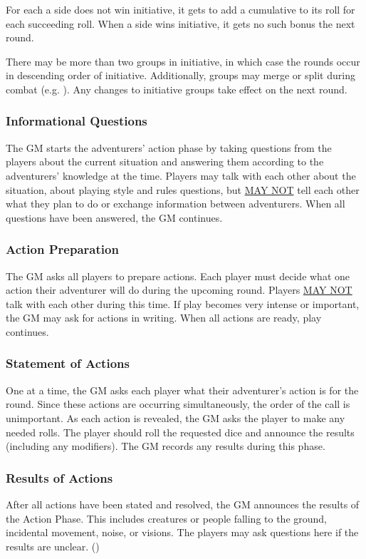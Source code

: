 \begin{multicols*}{2}
For each  a side does not win initiative, it gets to add a cumulative  to its roll for each succeeding roll. When a side wins initiative, it gets no such bonus the next round.

There may be more than two groups in initiative, in which case the rounds occur in descending order of initiative. Additionally, groups may merge or split during combat (e.g. ). Any changes to initiative groups take effect on the next round. 
\subsubsection{Informational Questions}
The GM starts the adventurers' action phase by taking questions from the players about the current situation and answering them according to the adventurers' knowledge at the time. Players may talk with each other about the situation, about playing style and rules questions, but \uline{MAY NOT} tell each other what they plan to do or exchange information between adventurers. When all questions have been answered, the GM continues.
\subsubsection{Action Preparation}
The GM asks all players to prepare actions. Each player must decide what one action their adventurer will do during the upcoming round. Players \uline{MAY NOT} talk with each other during this time. If play becomes very intense or important, the GM may ask for actions in writing. When all actions are ready, play continues.
\subsubsection{Statement of Actions}
One at a time, the GM asks each player what their adventurer's action is for the round. Since these actions are occurring simultaneously, the order of the call is unimportant. As each action is revealed, the GM asks the player to make any needed rolls. The player should roll the requested dice and announce the results (including any modifiers). The GM records any results during this phase.
\subsubsection{Results of Actions}
After all actions have been stated and resolved, the GM announces the results of the Action Phase. This includes creatures or people falling to the ground, incidental movement, noise, or visions. The players may ask questions here if the results are unclear. ()

\end{multicols*}
